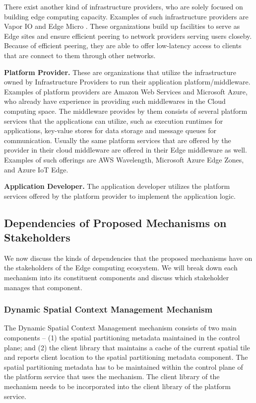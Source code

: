 \par There exist another kind of infrastructure providers, who are solely focused on building edge computing capacity. Examples of such infrastructure providers are Vapor IO \cite{vaporio} and Edge Micro \cite{edge_micro}. These organizations build up facilities to serve as Edge sites and ensure efficient peering to network providers serving users closeby. Because of efficient peering, they are able to offer low-latency access to clients that are connect to them through other networks.

\par \noindent \textbf{Platform Provider.} These are organizations that utilize the infrastructure owned by Infrastructure Providers to run their application platform/middleware. Examples of platform providers are Amazon Web Services and Microsoft Azure, who already have experience in providing such middlewares in the Cloud computing space. The middleware provides by them consists of several platform services that the applications can utilize, such as execution runtimes for applications, key-value stores for data storage and message queues for communication. Usually the same platform services that are offered by the provider in their cloud middleware are offered in their Edge middleware as well. Examples of such offerings are AWS Wavelength, Microsoft Azure Edge Zones, and Azure IoT Edge.

\par \noindent  \textbf{Application Developer. } The application developer utilizes the platform services offered by the platform provider to implement the application logic. 

\subsection{Dependencies of Proposed Mechanisms on Stakeholders}
We now discuss the kinds of dependencies that the proposed mechanisms have on the stakeholders of the Edge computing ecosystem. We will break down each mechanism into its constituent components and discuss which stakeholder manages that component.
\subsubsection{Dynamic Spatial Context Management Mechanism}
The Dynamic Spatial Context Management mechanism consists of two main components -- (1) the spatial partitioning metadata maintained in the control plane; and (2) the client library that maintains a cache of the current spatial tile and reports client location to the spatial partitioning metadata component. The spatial partitioning metadata has to be maintained within the control plane of the platform service that uses the mechanism. The client library of the mechanism needs to be incorporated into the client library of the platform service.
